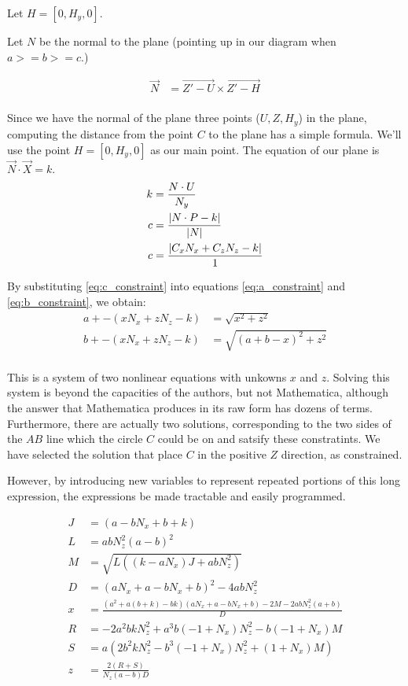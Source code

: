 \documentclass{article}
\begin{document}
Let $H = [0, H_y,0]$.

Let $N$ be the normal to the plane (pointing up in our diagram
when $ a >= b >= c $.)

\begin{align}
\overrightarrow{N} &= \overrightarrow{Z' - U}  \times \overrightarrow{Z' - H} \\
\end{align}

Since we have the normal of the plane three points ($U,Z,H_y$) in the plane,
computing the distance from the point $C$ to the plane has a simple
formula. We'll use the point $H = [0, H_y, 0]$ as our main point.
The equation of our plane is
$ \overrightarrow{N} \cdot \overrightarrow{X} = k$.
\begin{align}
k &= \frac{N \cdot U}{N_y} \\
c &= \frac{\left\lvert N \cdot P - k\right\rvert}{\left\lvert N\right\rvert} \\
c &= \frac{\left\lvert C_x  N_x  + C_z  N_z - k\right\rvert}{1} \label{eq:c_constraint}\\
\end{align}

By substituting \ref{eq:c_constraint} into equations
\ref{eq:a_constraint} and \ref{eq:b_constraint},
we obtain:
\begin{align}
a +  -(x N_x + z N_z - k) &= \sqrt{x^2 + z ^2} \\
b +  -(x N_x + z N_z - k) &= \sqrt{(a+b-x)^2 + z^2} \\
\end{align}

This is a system of two nonlinear equations with unkowns $x$ and $z$.
Solving this system is beyond the capacities of the authors,
but not Mathematica, although the answer that Mathematica produces
in its raw form has dozens of terms.
Furthermore, there are actually two solutions, corresponding
to the two sides of the $AB$ line which the circle $C$ could be
on and satsify these constratints.
We have selected the solution that place $C$ in the positive $Z$
direction, as constrained.

However, by introducing new variables to represent repeated
portions of this long expression, the expressions be
made tractable and easily programmed.

\begin{align*}
  J &= (a-b N_x+b+k) \\
  L &= a b N_z^2 (a-b)^2  \\
  M &= \sqrt{L  \left((k - a  N_x) J +a b
    N_z^2\right)}\\
  D &= (a N_x+a-b N_x+b)^2-4 a b N_z^2 \\
  x &= \frac{\left(a^2+a (b+k)-b
    k\right)
    (a N_x+a-b N_x+b) - 2 M -2 a b N_z^2 (a+b)}{D} \\
  R &=   -2 a^2 b k N_z^2 + a^3b(-1 + N_x) N_z^2 - b(-1 + N_x)M  \\
    S &= a (2 b^2 k N_z^2 - b^3(-1 + N_x)N_z^2 + (1 +N_x) M )
     \\
     z &= \frac{2 (R + S)}{N_z (a-b) D}\\
\end{align*}
\end{document}
